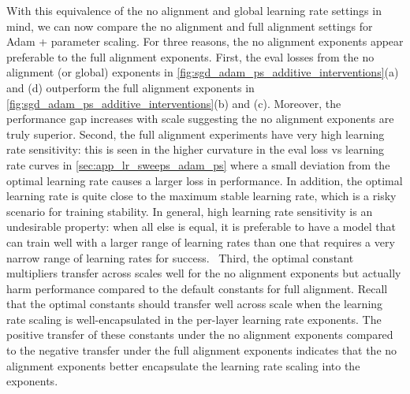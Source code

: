 \documentclass{article}
\theoremstyle{plain}
\theoremstyle{definition}
\theoremstyle{remark}
\begin{document}
With this equivalence of the no alignment and global learning rate settings in mind, we can now compare the no alignment and full alignment settings for Adam + parameter scaling. For three reasons, the no alignment exponents appear preferable to the full alignment exponents. First, the eval losses from the no alignment (or global) exponents in \cref{fig:sgd_adam_ps_additive_interventions}(a) and (d) outperform the full alignment exponents in \cref{fig:sgd_adam_ps_additive_interventions}(b) and (c). Moreover, the performance gap increases with scale suggesting the no alignment exponents are truly superior. Second, the full alignment experiments have very high learning rate sensitivity: this is seen in the higher curvature in the eval loss vs learning rate curves in \cref{sec:app_lr_sweeps_adam_ps} where a small deviation from the optimal learning rate causes a larger loss in performance. In addition, the optimal learning rate is quite close to the maximum stable learning rate, which is a risky scenario for training stability. In general, high learning rate sensitivity is an undesirable property: when all else is equal, it is preferable to have a model that can train well with a larger range of learning rates than one that requires a very narrow range of learning rates for success.~\citep{wortsman2023small} Third, the optimal constant multipliers transfer across scales well for the no alignment exponents but actually harm performance compared to the default constants for full alignment. Recall that the optimal constants should transfer well across scale when the learning rate scaling is well-encapsulated in the per-layer learning rate exponents. The positive transfer of these constants under the no alignment exponents compared to the negative transfer under the full alignment exponents indicates that the no alignment exponents better encapsulate the learning rate scaling into the exponents.
\end{document}
